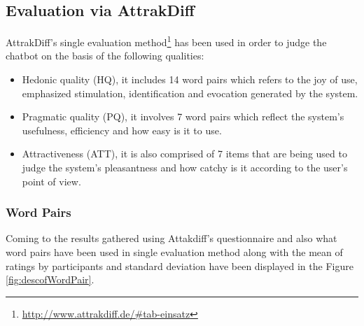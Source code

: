 \subsection{Evaluation via AttrakDiff}
AttrakDiff's single evaluation method\footnote{\url{http://www.attrakdiff.de/#tab-einsatz}} has been used in order to judge the chatbot on the basis of the following qualities:
\begin{itemize}
    \item Hedonic quality (HQ), it includes 14 word pairs which refers to the joy of use, emphasized stimulation, identification and evocation generated by the system.
    \item Pragmatic quality (PQ), it involves 7 word pairs which reflect the system's usefulness, efficiency and how easy is it to use.
    \item Attractiveness (ATT), it is also comprised of 7 items that are being used to judge the system's pleasantness and how catchy is it according to the user's point of view.
\end{itemize} 

\subsubsection*{Word Pairs}
Coming to the results gathered using Attakdiff's questionnaire and also what word pairs have been used in single evaluation method along with the mean of ratings by participants and standard deviation have been displayed in the Figure \ref{fig:descofWordPair}.


